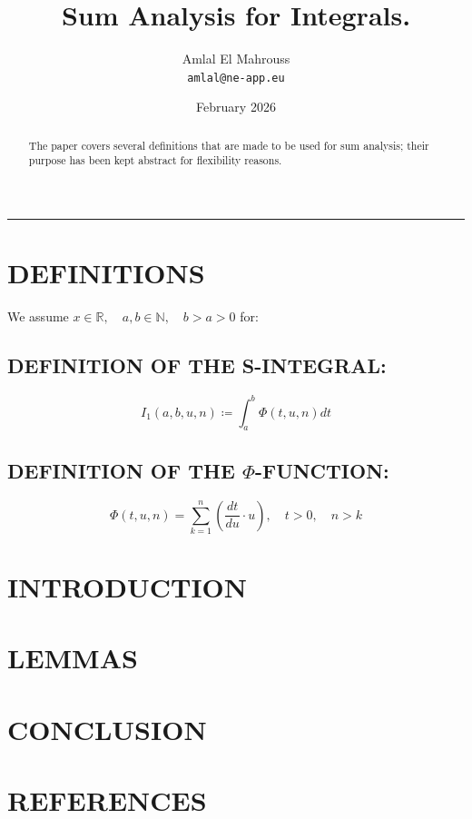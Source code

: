 \documentclass[11pt, a4paper]{article}
\title{Sum Analysis for Integrals.}
\author{Amlal El Mahrouss\\\texttt{amlal@ne-app.eu}}
\date{February 2026}
\begin{document}
\maketitle

\begin{abstract}
    The paper covers several definitions that are made to be used for sum analysis; their purpose has been kept abstract for flexibility reasons.
\end{abstract}

\begin{center}
	\rule[0.01cm]{17cm}{0.01cm}
\end{center}

\section{DEFINITIONS}

We assume $x \in \mathbb{R}, \quad a, b \in \mathbb{N}, \quad b > a > 0$ for:

\subsection{DEFINITION OF THE S-INTEGRAL:}
\begin{equation}
    I_{1}(a, b, u, n) \coloneqq \int_{a}^{b} \Phi(t, u, n)dt
\end{equation}
\subsection{DEFINITION OF THE $\Phi$-FUNCTION:}
\begin{equation}
    \Phi(t, u, n) = \sum_{k=1}^{n} (\frac{dt}{du}\cdot u), \quad t > 0, \quad n > k
\end{equation}

\section{INTRODUCTION}

\section{LEMMAS}

\section{CONCLUSION}

\section{REFERENCES}
\end{document}
